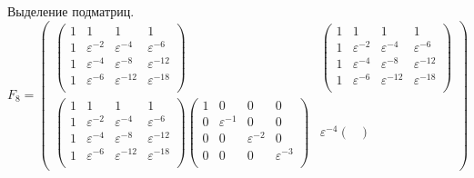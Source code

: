 Выделение подматриц.
\[
    F_8
    = \begin{pmatrix}
        \begin{pmatrix}
            1 & 1                & 1                 & 1                 \\
            1 & \varepsilon^{-2} & \varepsilon^{-4}  & \varepsilon^{-6}  \\
            1 & \varepsilon^{-4} & \varepsilon^{-8}  & \varepsilon^{-12} \\
            1 & \varepsilon^{-6} & \varepsilon^{-12} & \varepsilon^{-18} \\
        \end{pmatrix}
         &
        \begin{pmatrix}
            1 & 1                & 1                 & 1                 \\
            1 & \varepsilon^{-2} & \varepsilon^{-4}  & \varepsilon^{-6}  \\
            1 & \varepsilon^{-4} & \varepsilon^{-8}  & \varepsilon^{-12} \\
            1 & \varepsilon^{-6} & \varepsilon^{-12} & \varepsilon^{-18} \\
        \end{pmatrix} \\
        \begin{pmatrix}
            1 & 1                & 1                 & 1                 \\
            1 & \varepsilon^{-2} & \varepsilon^{-4}  & \varepsilon^{-6}  \\
            1 & \varepsilon^{-4} & \varepsilon^{-8}  & \varepsilon^{-12} \\
            1 & \varepsilon^{-6} & \varepsilon^{-12} & \varepsilon^{-18} \\
        \end{pmatrix}
        \begin{pmatrix}
            1 & 0                & 0                & 0                \\
            0 & \varepsilon^{-1} & 0                & 0                \\
            0 & 0                & \varepsilon^{-2} & 0                \\
            0 & 0                & 0                & \varepsilon^{-3} \\
        \end{pmatrix}
         &
        \varepsilon^{-4}
        \begin{pmatrix}

\end{pmatrix}
\end{pmatrix}\]
